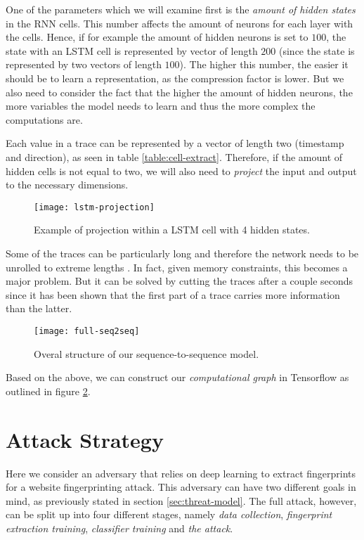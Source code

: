 One of the parameters which we will examine first is the \textit{amount of hidden states} in the RNN cells.
This number affects the amount of neurons for each layer with the cells.
Hence, if for example the amount of hidden neurons is set to $100$, the state with an LSTM cell is represented by vector of length $200$ (since the state is represented by two vectors of length $100$).
The higher this number, the easier it should be to learn a representation, as the compression factor is lower.
But we also need to consider the fact that the higher the amount of hidden neurons, the more variables the model needs to learn and thus the more complex the computations are.

Each value in a trace can be represented by a vector of length two (timestamp and direction), as seen in table \ref{table:cell-extract}.
Therefore, if the amount of hidden cells is not equal to two, we will also need to \textit{project} the input and output to the necessary dimensions.

\begin{figure}[ht]
  \centering
  \texttt{[image: lstm-projection]}
  \caption{Example of projection within a LSTM cell with 4 hidden states.}
  \label{fig:lstm-projection}
\end{figure}

\newpage

Some of the traces can be particularly long and therefore the network needs to be unrolled to extreme lengths \cite{greschbach2016effect}.
In fact, given memory constraints, this becomes a major problem.
But it can be solved by cutting the traces after a couple seconds since it has been shown that the first part of a trace carries more information than the latter.

\begin{figure}[ht]
  \centering
  \texttt{[image: full-seq2seq]}
  \caption{Overal structure of our sequence-to-sequence model.}
  \label{fig:full-seq2seq}
\end{figure}

Based on the above, we can construct our \textit{computational graph} in Tensorflow as outlined in figure \ref{fig:full-seq2seq}.

\section{Attack Strategy}

Here we consider an adversary that relies on deep learning to extract fingerprints for a website fingerprinting attack.
This adversary can have two different goals in mind, as previously stated in section \ref{sec:threat-model}.
The full attack, however, can be split up into four different stages, namely \textit{data collection}, \textit{fingerprint extraction training}, \textit{classifier training} and \textit{the attack}.

